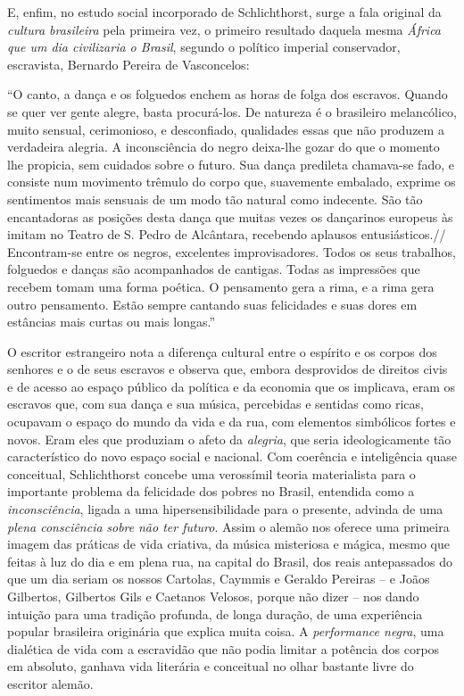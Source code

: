 E, enfim, no estudo social incorporado de Schlichthorst, surge a fala
original da \emph{cultura brasileira} pela primeira vez, o primeiro
resultado daquela mesma \emph{África que um dia civilizaria o Brasil},
segundo o político imperial conservador, escravista, Bernardo Pereira de
Vasconcelos:

``O canto, a dança e os folguedos enchem as horas de folga dos escravos.
Quando se quer ver gente alegre, basta procurá-los. De natureza é o
brasileiro melancólico, muito sensual, cerimonioso, e desconfiado,
qualidades essas que não produzem a verdadeira alegria. A inconsciência
do negro deixa-lhe gozar do que o momento lhe propicia, sem cuidados
sobre o futuro. Sua dança predileta chamava-se fado, e consiste num
movimento trêmulo do corpo que, suavemente embalado, exprime os
sentimentos mais sensuais de um modo tão natural como indecente. São tão
encantadoras as posições desta dança que muitas vezes os dançarinos
europeus às imitam no Teatro de S. Pedro de Alcântara, recebendo
aplausos entusiásticos.// Encontram-se entre os negros, excelentes
improvisadores. Todos os seus trabalhos, folguedos e danças são
acompanhados de cantigas. Todas as impressões que recebem tomam uma
forma poética. O pensamento gera a rima, e a rima gera outro pensamento.
Estão sempre cantando suas felicidades e suas dores em estâncias mais
curtas ou mais longas.''

O escritor estrangeiro nota a diferença cultural entre o espírito e os
corpos dos senhores e o de seus escravos e observa que, embora
desprovidos de direitos civis e de acesso ao espaço público da política
e da economia que os implicava, eram os escravos que, com sua dança e
sua música, percebidas e sentidas como ricas, ocupavam o espaço do mundo
da vida e da rua, com elementos simbólicos fortes e novos. Eram eles que
produziam o afeto da \emph{alegria}, que seria ideologicamente tão
característico do novo espaço social e nacional. Com coerência e
inteligência quase conceitual, Schlichthorst concebe uma verossímil
teoria materialista para o importante problema da felicidade dos pobres
no Brasil, entendida como a \emph{inconsciência}, ligada a uma
hipersensibilidade para o presente, advinda de uma \emph{plena
consciência} \emph{sobre} \emph{não ter futuro}. Assim o alemão nos
oferece uma primeira imagem das práticas de vida criativa, da música
misteriosa e mágica, mesmo que feitas à luz do dia e em plena rua, na
capital do Brasil, dos reais antepassados do que um dia seriam os nossos
Cartolas, Caymmis e Geraldo Pereiras -- e Joãos Gilbertos, Gilbertos
Gils e Caetanos Velosos, porque não dizer -- nos dando intuição para uma
tradição profunda, de longa duração, de uma experiência popular
brasileira originária que explica muita coisa. A \emph{performance
negra}, uma dialética de vida com a escravidão que não podia limitar a
potência dos corpos em absoluto, ganhava vida literária e conceitual no
olhar bastante livre do escritor alemão.

